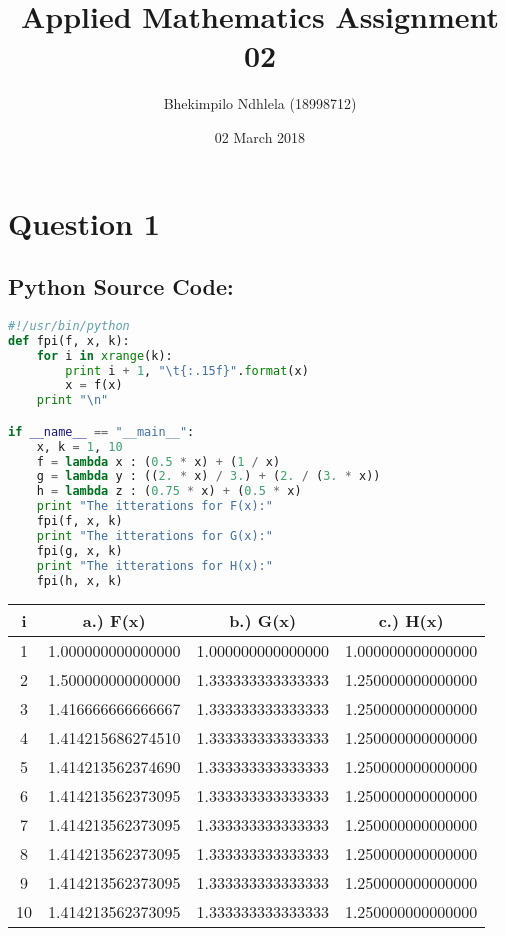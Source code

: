 \documentclass{article}
\title{Applied Mathematics Assignment 02}
\author{Bhekimpilo Ndhlela (18998712)}
\date{02 March 2018}
\begin{document}
\maketitle
\pagebreak
\section*{Question 1}
\subsection*{Python Source Code: }
\begin{lstlisting}[language=Python]
#!/usr/bin/python
def fpi(f, x, k):
    for i in xrange(k):
        print i + 1, "\t{:.15f}".format(x)
        x = f(x)
    print "\n"

if __name__ == "__main__":
    x, k = 1, 10
    f = lambda x : (0.5 * x) + (1 / x)
    g = lambda y : ((2. * x) / 3.) + (2. / (3. * x))
    h = lambda z : (0.75 * x) + (0.5 * x)
    print "The itterations for F(x):"
    fpi(f, x, k)
    print "The itterations for G(x):"
    fpi(g, x, k)
    print "The itterations for H(x):"
    fpi(h, x, k)

\end{lstlisting}


\begin{center}
    \begin{tabular}{||c c c c||}
    \hline
    i & a.) F(x) & b.) G(x) & c.) H(x) \\ [0.5ex]
    \hline\hline
    1 & 1.000000000000000 & 1.000000000000000 & 1.000000000000000  \\ [1ex]
    \hline
    2 & 1.500000000000000 & 1.333333333333333 & 1.250000000000000 \\ [1ex]
    \hline
    3 & 1.416666666666667 & 1.333333333333333 & 1.250000000000000 \\ [1ex]
    \hline
    4 & 1.414215686274510 & 1.333333333333333 & 1.250000000000000 \\ [1ex]
    \hline
    5 & 1.414213562374690 & 1.333333333333333 & 1.250000000000000 \\ [1ex]
    \hline
    6 & 1.414213562373095 & 1.333333333333333 & 1.250000000000000 \\ [1ex]
    \hline
    7 & 1.414213562373095 & 1.333333333333333 & 1.250000000000000 \\ [1ex]
    \hline
    8 & 1.414213562373095 & 1.333333333333333 & 1.250000000000000 \\ [1ex]
    \hline
    9 & 1.414213562373095 & 1.333333333333333 & 1.250000000000000 \\ [1ex]
    \hline
    10 & 1.414213562373095 & 1.333333333333333 & 1.250000000000000 \\ [1ex]
    \hline
    \end{tabular}
\end{center}
\end{document}
